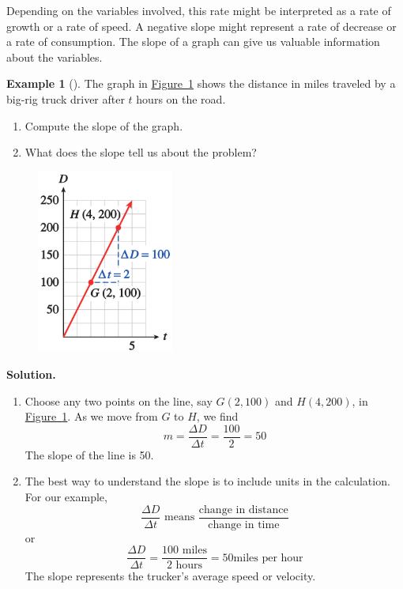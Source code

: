 \documentclass[10pt,]{book}
\theoremstyle{plain}
\theoremstyle{definition}
\theoremstyle{definition}
\newtheorem{example}[theorem]{Example}
\numberwithin{equation}{section}
\begin{document}
    Depending on the variables involved, this rate might be interpreted as a rate of growth or a rate of speed. A negative slope might represent a rate of decrease or a rate of consumption. The slope of a graph can give us valuable information about the variables.
%
\begin{example}[]\label{example-truck-speed}
The graph in \hyperref[fig-truck-speed]{Figure~\ref{fig-truck-speed}} shows the distance in miles traveled by a big-rig truck driver after \(t\) hours on the road. 
        \leavevmode%
\begin{enumerate}[label=*\alph**]
\item\hypertarget{li-145}{}Compute the slope of the graph.\item\hypertarget{li-146}{}What does the slope tell us about the problem?\end{enumerate}

\leavevmode%
\begin{figure}
\centering
\includegraphics[width=0.40\textwidth,]{images/fig-truck-speed.svg}\caption{\label{fig-truck-speed}}
\end{figure}
\par\medskip\noindent%
\textbf{Solution.}\quad \leavevmode%
\begin{enumerate}[label=*\alph**]
\item\hypertarget{li-147}{}Choose any two points on the line, say \(G(2, 100)\) and \(H(4, 200)\), in \hyperref[fig-truck-speed]{Figure~\ref{fig-truck-speed}}. As we move from \(G\) to \(H\), we find
            \begin{equation*}m = \frac{\Delta D}{\Delta t}=\frac{100}{2}=50\end{equation*}
            The slope of the line is 50.\item\hypertarget{li-148}{}The best way to understand the slope is to include units in the calculation. For our example,
            \begin{equation*}\frac{\Delta D}{\Delta t} \text{ means } \frac{\text{change in distance}}{\text{change in time}}\end{equation*}
            or
            \begin{equation*}\frac{\Delta D}{\Delta t}
                =\frac{100 \text{ miles}}{2\text{ hours}}
                =50 \text{miles per hour}\end{equation*}
                The slope represents the trucker’s average speed or velocity.\end{enumerate}
\end{example}
\end{document}
